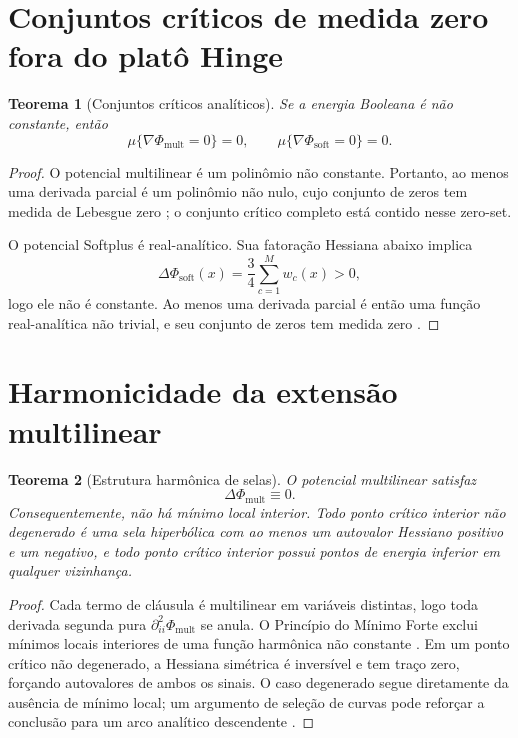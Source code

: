 \documentclass[11pt,a4paper]{article}
\newtheorem{theorem}{Teorema}[section]
\begin{document}
\section{Conjuntos críticos de medida zero fora do platô Hinge}
\begin{theorem}[Conjuntos críticos analíticos]
Se a energia Booleana é não constante, então
\[
\mu\{\nabla\Phi_{\mathrm{mult}}=0\}=0,
\qquad
\mu\{\nabla\Phi_{\mathrm{soft}}=0\}=0.
\]
\end{theorem}
\begin{proof}
O potencial multilinear é um polinômio não constante. Portanto, ao menos uma derivada parcial é um polinômio não nulo, cujo conjunto de zeros tem medida de Lebesgue zero \cite{okamoto1973distinctness,caron2005zero}; o conjunto crítico completo está contido nesse zero-set.

O potencial Softplus é real-analítico. Sua fatoração Hessiana abaixo implica
\[
\Delta\Phi_{\mathrm{soft}}(x)=\frac34\sum_{c=1}^M w_c(x)>0,
\]
logo ele não é constante. Ao menos uma derivada parcial é então uma função real-analítica não trivial, e seu conjunto de zeros tem medida zero \cite{krantz2002primer}.
\end{proof}

\section{Harmonicidade da extensão multilinear}
\begin{theorem}[Estrutura harmônica de selas]
O potencial multilinear satisfaz
\[
\Delta\Phi_{\mathrm{mult}}\equiv0.
\]
Consequentemente, não há mínimo local interior. Todo ponto crítico interior não degenerado é uma sela hiperbólica com ao menos um autovalor Hessiano positivo e um negativo, e todo ponto crítico interior possui pontos de energia inferior em qualquer vizinhança.
\end{theorem}
\begin{proof}
Cada termo de cláusula é multilinear em variáveis distintas, logo toda derivada segunda pura $\partial_{ii}^2\Phi_{\mathrm{mult}}$ se anula. O Princípio do Mínimo Forte exclui mínimos locais interiores de uma função harmônica não constante \cite{courant1962methods,evans2010partial}. Em um ponto crítico não degenerado, a Hessiana simétrica é inversível e tem traço zero, forçando autovalores de ambos os sinais. O caso degenerado segue diretamente da ausência de mínimo local; um argumento de seleção de curvas pode reforçar a conclusão para um arco analítico descendente \cite{milnor1968singular}.
\end{proof}
\end{document}
